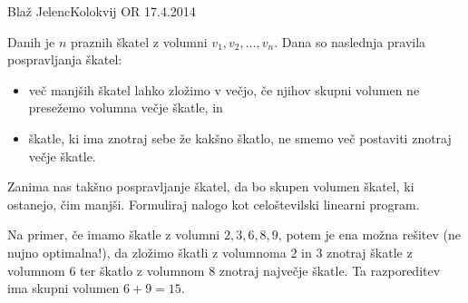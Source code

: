 \begin{naloga}{Blaž Jelenc}{Kolokvij OR 17.4.2014}
\begin{vprasanje}
Danih je $n$ praznih škatel z volumni $v_1, v_2, \dots, v_n$.
Dana so naslednja pravila pospravljanja škatel:
\begin{itemize}
\item več manjših škatel lahko zložimo v večjo,
če njihov skupni volumen ne presežemo volumna večje škatle, in
\item škatle, ki ima znotraj sebe že kakšno škatlo,
ne smemo več postaviti znotraj večje škatle.
\end{itemize}
Zanima nas takšno pospravljanje škatel,
da bo skupen volumen škatel, ki ostanejo, čim manjši.
Formuliraj nalogo kot celoštevilski linearni program.

Na primer, če imamo škatle z volumni $2, 3, 6, 8, 9$,
potem je ena možna rešitev (ne nujno optimalna!),
da zložimo škatli z volumnoma $2$ in $3$ znotraj škatle z volumnom $6$
ter škatlo z volumnom $8$ znotraj največje škatle.
Ta razporeditev ima skupni volumen $6 + 9 = 15$.
\end{vprasanje}
\begin{odgovor}
\end{odgovor}
\end{naloga}
